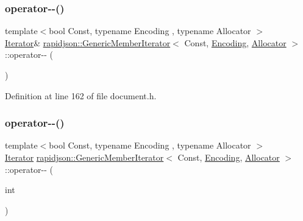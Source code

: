 \subsubsection{\texorpdfstring{operator-\/-\/()}{operator--()}\hspace{0.1cm}{\footnotesize\ttfamily [1/2]}}
{\footnotesize\ttfamily template$<$bool Const, typename Encoding , typename Allocator $>$ \\
\mbox{\hyperlink{classrapidjson_1_1_generic_member_iterator_a37091c3dd8470486ef5188f3c1108653}{Iterator}}\& \mbox{\hyperlink{classrapidjson_1_1_generic_member_iterator}{rapidjson\+::\+Generic\+Member\+Iterator}}$<$ Const, \mbox{\hyperlink{classrapidjson_1_1_encoding}{Encoding}}, \mbox{\hyperlink{classrapidjson_1_1_allocator}{Allocator}} $>$\+::operator-\/-\/ (\begin{DoxyParamCaption}{ }\end{DoxyParamCaption})}



Definition at line 162 of file document.\+h.


\begin{DoxyCode}{0}

\end{DoxyCode}
\mbox{\label{classrapidjson_1_1_generic_member_iterator_aeb9ae9faaca1608e9ee93ebb50892839}} 
\subsubsection{\texorpdfstring{operator-\/-\/()}{operator--()}\hspace{0.1cm}{\footnotesize\ttfamily [2/2]}}
{\footnotesize\ttfamily template$<$bool Const, typename Encoding , typename Allocator $>$ \\
\mbox{\hyperlink{classrapidjson_1_1_generic_member_iterator_a37091c3dd8470486ef5188f3c1108653}{Iterator}} \mbox{\hyperlink{classrapidjson_1_1_generic_member_iterator}{rapidjson\+::\+Generic\+Member\+Iterator}}$<$ Const, \mbox{\hyperlink{classrapidjson_1_1_encoding}{Encoding}}, \mbox{\hyperlink{classrapidjson_1_1_allocator}{Allocator}} $>$\+::operator-\/-\/ (\begin{DoxyParamCaption}\item[{int}]{ }\end{DoxyParamCaption})}



